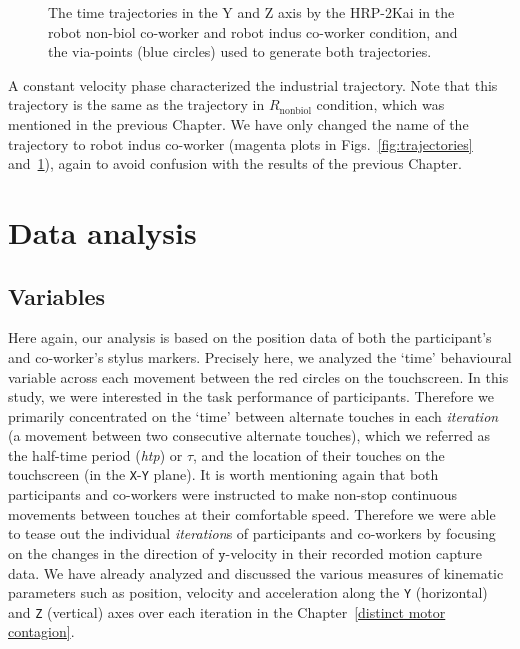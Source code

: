 \begin{figure}[hpt]
	\caption{The time trajectories in the Y and Z axis by the HRP-2Kai in the robot non-biol co-worker and robot indus co-worker condition, and the via-points (blue circles) used to generate both trajectories.}
	\label{fig:trajectories2}
\end{figure}


A constant velocity phase characterized the industrial trajectory. Note that this trajectory is the same as the trajectory in $R_{\text{nonbiol}}$ condition, which was mentioned in the previous Chapter. We have only changed the name of the trajectory to robot indus co-worker (magenta plots in Figs.~\ref{fig:trajectories} and~\ref{fig:trajectories2}), again to avoid confusion with the results of the previous Chapter.


\section{Data analysis} \label{data_analysis}

\subsection{Variables}

Here again, our analysis is based on the position data of both the participant's and co-worker's stylus markers. Precisely here, we analyzed the `time' behavioural variable across each movement between the red circles on the touchscreen. In this study, we were interested in the task performance of participants. Therefore we primarily concentrated on the `time' between alternate touches in each \textit{iteration} (a movement between two consecutive alternate touches), which we referred as the half-time period ({\it htp}) or $\tau$, and the location of their touches on the touchscreen (in the \texttt{X}-\texttt{Y} plane). It is worth mentioning again that both participants and co-workers were instructed to make non-stop continuous movements between touches at their comfortable speed. Therefore we were able to tease out the individual \textit{iteration}s of participants and co-workers by focusing on the changes in the direction of $\texttt{y}$-velocity in their recorded motion capture data. We have already analyzed and discussed the various measures of kinematic parameters such as position, velocity and acceleration along the \texttt{Y} (horizontal) and \texttt{Z} (vertical) axes over each iteration in the Chapter~\ref{distinct motor contagion}.


